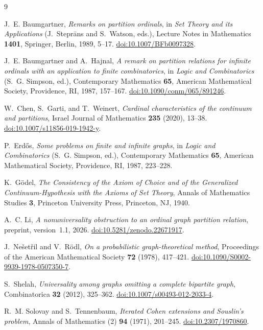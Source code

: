 \documentclass[10pt,letterpaper,leqno]{amsart}
\numberwithin{equation}{section}
\theoremstyle{definition}
\theoremstyle{remark}
\begin{document}
\begin{thebibliography}{9}
\raggedright

J.~E. Baumgartner,
\emph{Remarks on partition ordinals},
in \emph{Set Theory and its Applications} (J.~Stepr\={a}ns and
S.~Watson, eds.), Lecture Notes in Mathematics \textbf{1401},
Springer, Berlin, 1989, 5--17.
\href{https://doi.org/10.1007/BFb0097328}{doi:10.1007/BFb0097328}.

J.~E. Baumgartner and A.~Hajnal,
\emph{A remark on partition relations for infinite ordinals with an
application to finite combinatorics},
in \emph{Logic and Combinatorics} (S.~G. Simpson, ed.),
Contemporary Mathematics \textbf{65}, American Mathematical Society,
Providence, RI, 1987, 157--167.
\href{https://doi.org/10.1090/conm/065/891246}{doi:10.1090/conm/065/891246}.

W.~Chen, S.~Garti, and T.~Weinert,
\emph{Cardinal characteristics of the continuum and partitions},
Israel Journal of Mathematics \textbf{235} (2020), 13--38.
\href{https://doi.org/10.1007/s11856-019-1942-y}{doi:10.1007/s11856-019-1942-y}.

P.~Erd\H{o}s,
\emph{Some problems on finite and infinite graphs},
in \emph{Logic and Combinatorics} (S.~G. Simpson, ed.),
Contemporary Mathematics \textbf{65}, American Mathematical Society,
Providence, RI, 1987, 223--228.

K.~G\"odel,
\emph{The Consistency of the Axiom of Choice and of the Generalized
Continuum-Hypothesis with the Axioms of Set Theory},
Annals of Mathematics Studies \textbf{3},
Princeton University Press, Princeton, NJ, 1940.

A.~C. Li,
\emph{A nonuniversality obstruction to an ordinal graph partition relation},
preprint, version~1.1, 2026.
\href{https://doi.org/10.5281/zenodo.22671917}{doi:10.5281/zenodo.22671917}.

J.~Ne\v{s}et\v{r}il and V.~R\"odl,
\emph{On a probabilistic graph-theoretical method},
Proceedings of the American Mathematical Society \textbf{72} (1978),
417--421.
\href{https://doi.org/10.1090/S0002-9939-1978-0507350-7}{doi:10.1090/S0002-9939-1978-0507350-7}.

S.~Shelah,
\emph{Universality among graphs omitting a complete bipartite graph},
Combinatorica \textbf{32} (2012), 325--362.
\href{https://doi.org/10.1007/s00493-012-2033-4}{doi:10.1007/s00493-012-2033-4}.

R.~M. Solovay and S.~Tennenbaum,
\emph{Iterated Cohen extensions and Souslin's problem},
Annals of Mathematics (2) \textbf{94} (1971), 201--245.
\href{https://doi.org/10.2307/1970860}{doi:10.2307/1970860}.

\end{thebibliography}
\end{document}
